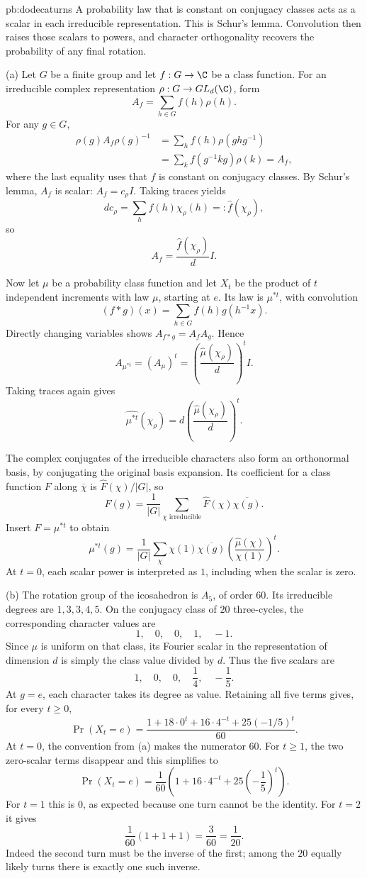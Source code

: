 \begin{solution}{pb:dodecaturns}
\idea A probability law that is constant on conjugacy classes acts as a scalar in each irreducible representation. This is Schur's lemma. Convolution then raises those scalars to powers, and character orthogonality recovers the probability of any final rotation.

\writeup (a) Let $G$ be a finite group and let $f:G\to\C$ be a class function. For an irreducible complex representation $\rho:G\to GL_d(\C)$, form
\[
A_f=\sum_{h\in G}f(h)\rho(h).
\]
For any $g\in G$,
\[
\begin{aligned}
\rho(g)A_f\rho(g)^{-1}
&=\sum_h f(h)\rho(ghg^{-1})\\
&=\sum_k f(g^{-1}kg)\rho(k)=A_f,
\end{aligned}
\]
where the last equality uses that $f$ is constant on conjugacy classes. By Schur's lemma, $A_f$ is scalar: $A_f=c_\rho I$. Taking traces yields
\[
dc_\rho=\sum_h f(h)\chi_\rho(h)=:\widehat f(\chi_\rho),
\]
so
\[
\boxed{A_f=\frac{\widehat f(\chi_\rho)}d I}.
\]

Now let $\mu$ be a probability class function and let $X_t$ be the product of $t$ independent increments with law $\mu$, starting at $e$. Its law is $\mu^{*t}$, with convolution
\[
(f*g)(x)=\sum_{h\in G}f(h)g(h^{-1}x).
\]
Directly changing variables shows $A_{f*g}=A_fA_g$. Hence
\[
A_{\mu^{*t}}=(A_\mu)^t
=\left(\frac{\widehat\mu(\chi_\rho)}d\right)^tI.
\]
Taking traces again gives
\[
\widehat{\mu^{*t}}(\chi_\rho)
=d\left(\frac{\widehat\mu(\chi_\rho)}d\right)^t.
\]

The complex conjugates of the irreducible characters also form an orthonormal basis, by conjugating the original basis expansion. Its coefficient for a class function $F$ along $\overline\chi$ is $\widehat F(\chi)/|G|$, so
\[
F(g)=\frac1{|G|}\sum_{\chi\text{ irreducible}}
\widehat F(\chi)\overline{\chi(g)}.
\]
Insert $F=\mu^{*t}$ to obtain
\[
\boxed{\mu^{*t}(g)=\frac1{|G|}
\sum_\chi\chi(1)\overline{\chi(g)}
\left(\frac{\widehat\mu(\chi)}{\chi(1)}\right)^t}.
\]
At $t=0$, each scalar power is interpreted as $1$, including when the scalar is zero.

(b) The rotation group of the icosahedron is $A_5$, of order $60$. Its irreducible degrees are $1,3,3,4,5$. On the conjugacy class of $20$ three-cycles, the corresponding character values are
\[
1,\quad0,\quad0,\quad1,\quad-1.
\]
Since $\mu$ is uniform on that class, its Fourier scalar in the representation of dimension $d$ is simply the class value divided by $d$. Thus the five scalars are
\[
1,\quad0,\quad0,\quad\frac14,\quad-\frac15.
\]
At $g=e$, each character takes its degree as value. Retaining all five
terms gives, for every $t\ge0$,
\[
\boxed{\Pr(X_t=e)=\frac{1+18\cdot0^t+16\cdot4^{-t}
+25(-1/5)^t}{60}}.
\]
At $t=0$, the convention from (a) makes the numerator $60$.
For $t\ge1$, the two zero-scalar terms disappear and this simplifies to
\[
\boxed{\Pr(X_t=e)
=\frac1{60}\left(1+16\cdot4^{-t}
+25\left(-\frac15\right)^t\right)}.
\]
For $t=1$ this is $0$, as expected because one turn cannot be the identity. For $t=2$ it gives
\[
\frac1{60}(1+1+1)=\frac3{60}=\frac1{20}.
\]
Indeed the second turn must be the inverse of the first; among the $20$ equally likely turns there is exactly one such inverse.


\end{solution}
